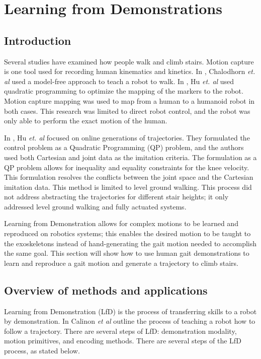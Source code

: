 
\section{Learning from Demonstrations}
\label{sec:lfd}

\subsection{Introduction}


 Several studies have examined how people walk and climb stairs. Motion capture is one tool used for recording human kinematics and kinetics. In  \cite{chalodhorn2007learning}, Chalodhorn \textit{et. al} used a model-free approach to teach a robot to walk. In  \cite{hu2014online}, Hu \textit{et. al} used quadratic programming to optimize the mapping of the markers to the robot. Motion capture mapping was used to map from a human to a humanoid robot in both cases. This research was limited to direct robot control, and the robot was only able to perform the exact motion of the human.

 In \cite{taskjointmocap}, Hu \textit{et. al} focused on online generations of trajectories. They formulated the control problem as a Quadratic Programming (QP) problem, and the authors used both Cartesian and joint data as the imitation criteria. The formulation as a QP problem allows for inequality and equality constraints for the knee velocity. This formulation resolves the conflicts between the joint space and the Cartesian imitation data. This method is limited to level ground walking. This process did not address abstracting the trajectories for different stair heights; it only addressed level ground walking and fully actuated systems.
 
 Learning from Demonstration allows for complex motions to be learned and reproduced on robotics systems; this enables the desired motion to be taught to the exoskeletons instead of hand-generating the gait motion needed to accomplish the same goal. This section will show how to use human gait demonstrations to learn and reproduce a gait motion and generate a trajectory to climb stairs.  


\subsection{Overview of methods and applications}
Learning from Demonstration (LfD) is the process of transferring skills to a robot by demonstration. In \cite{siciliano2016springer}  \cite{kormushev2011imitation} \cite{calinon2007teacher} Calinon \textit{et al} outline the process of teaching a robot how to follow a trajectory. There are several steps of LfD: demonstration modality, motion primitives, and encoding methods. There are several steps of the LfD process, as stated below. 

